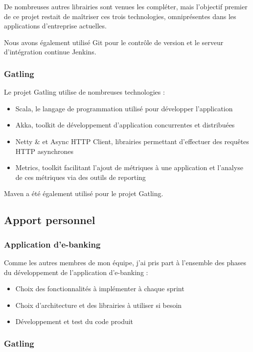 De nombreuses autres librairies sont venues les compléter, mais l'objectif premier de ce projet restait de maîtriser ces trois technologies, omniprésentes dans les applications d'entreprise actuelles.

Nous avons également utilisé Git pour le contrôle de version et le serveur d'intégration continue Jenkins.
\subsubsection*{Gatling}

Le projet Gatling utilise de nombreuses  technologies :
\begin{itemize}
	\item Scala, le langage de programmation utilisé pour développer l'application
	\item Akka, toolkit de développement d'application concurrentes et distribuées
	\item Netty \& et Async HTTP Client, librairies permettant d'effectuer des requêtes HTTP asynchrones
	\item Metrics, toolkit facilitant l'ajout de métriques à une application et l'analyse de ces métriques via des outils de reporting
\end{itemize}
Maven a été également utilisé pour le projet Gatling.

\subsection{Apport personnel}

\subsubsection*{Application d'e-banking}

Comme les autres membres de mon équipe, j'ai pris part à l'ensemble des phases du développement de l'application d'e-banking :
\begin{itemize}
	\item Choix des fonctionnalités à implémenter à chaque sprint
	\item Choix d'architecture et des librairies à utiliser si besoin
	\item Développement et test du code produit
\end{itemize}

\subsubsection*{Gatling}


